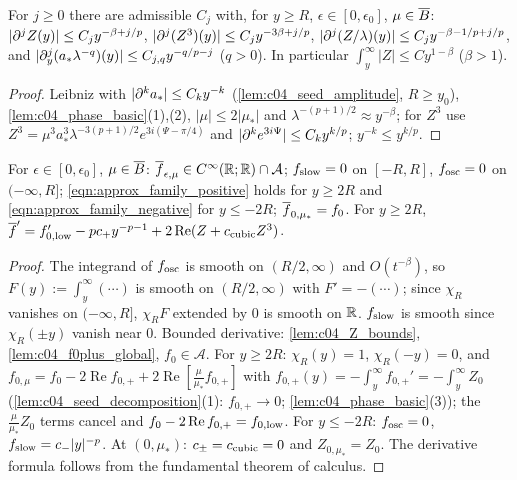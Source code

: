 \begin{lemma}
  \label{lem:c04_Z_bounds}
  For $j\ge0$ there are admissible $C_j$ with, for $y\ge R$, $\epsilon\in[0,\epsilon_0]$, $\mu\in\overline{B}$:
  $|\partial^jZ(y)|\le C_jy^{-\beta+j/p}$, $|\partial^j(Z^3)(y)|\le C_jy^{-3\beta+j/p}$, $|\partial^j(Z/\lambda)(y)|\le C_jy^{-\beta-1/p+j/p}$, and
  $|\partial^j_y(a_*\lambda^{-q})(y)|\le C_{j,q}y^{-q/p-j}$ ($q>0$). In particular $\int_y^\infty|Z|\le C y^{1-\beta}$ ($\beta>1$).
\end{lemma}
\begin{proof}
  Leibniz with $|\partial^ka_*|\le C_ky^{-k}$ (\cref{lem:c04_seed_amplitude}, $R\ge y_0$), \cref{lem:c04_phase_basic}(1),(2), $|\mu|\le2|\mu_*|$ and
  $\lambda^{-(p+1)/2}\approx y^{-\beta}$; for $Z^3$ use $Z^3=\mu^3a_*^3\lambda^{-3(p+1)/2}e^{3i(\Psi-\pi/4)}$ and $|\partial^ke^{3i\Psi}|\le C_ky^{k/p}$;
  $y^{-k}\le y^{k/p}$.
\end{proof}

\begin{lemma}
  \label{lem:c04_family_regions}
  For $\epsilon\in[0,\epsilon_0]$, $\mu\in\overline{B}$: $\overline{f}_{\epsilon,\mu}\in C^\infty(\mathbb{R};\mathbb{R})\cap\mathcal A$; $f_{\textup{slow}}=0$ on $[-R,R]$,
  $f_{\textup{osc}}=0$ on $(-\infty,R]$; \eqref{eqn:approx_family_positive} holds for $y\ge2R$ and \eqref{eqn:approx_family_negative} for $y\le-2R$;
  $\overline{f}_{0,\mu_*}=f_0$. For $y\ge2R$, $\overline{f}'=f_{0,\textup{low}}'-pc_+y^{-p-1}+2\operatorname{Re}(Z+c_{\textup{cubic}}Z^3)$.
\end{lemma}
\begin{proof}
  The integrand of $f_{\textup{osc}}$ is smooth on $(R/2,\infty)$ and $O(t^{-\beta})$, so $F(y):=\int_y^\infty(\cdots)$ is smooth on $(R/2,\infty)$ with
  $F'=-(\cdots)$; since $\chi_R$ vanishes on $(-\infty,R]$, $\chi_RF$ extended by $0$ is smooth on $\mathbb{R}$. $f_{\textup{slow}}$ is smooth since
  $\chi_R(\pm y)$ vanish near $0$. Bounded derivative: \cref{lem:c04_Z_bounds}, \cref{lem:c04_f0plus_global}, $f_0\in\mathcal A$. For $y\ge2R$:
  $\chi_R(y)=1$, $\chi_R(-y)=0$, and $f_{0,\mu}=f_0-2\operatorname{Re}f_{0,+}+2\operatorname{Re}[\frac\mu{\mu_*}f_{0,+}]$ with
  $f_{0,+}(y)=-\int_y^\infty f_{0,+}'=-\int_y^\infty Z_0$ (\cref{lem:c04_seed_decomposition}(1): $f_{0,+}\to0$; \cref{lem:c04_phase_basic}(3)); the
  $\frac\mu{\mu_*}Z_0$ terms cancel and $f_0-2\operatorname{Re}f_{0,+}=f_{0,\textup{low}}$. For $y\le-2R$: $f_{\textup{osc}}=0$, $f_{\textup{slow}}=c_-|y|^{-p}$.
  At $(0,\mu_*)$: $c_\pm=c_{\textup{cubic}}=0$ and $Z_{0,\mu_*}=Z_0$. The derivative formula follows from the fundamental theorem of calculus.
\end{proof}

